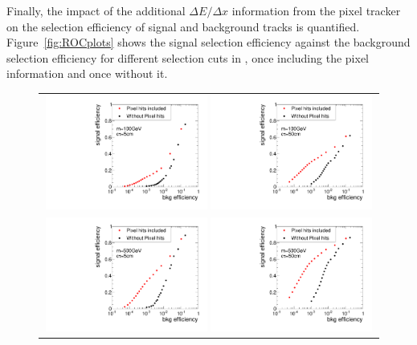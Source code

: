 Finally, the impact of the additional $\Delta E/\Delta x$ information from the pixel tracker on the selection efficiency of signal and background tracks is quantified.
Figure~\ref{fig:ROCplots} shows the signal selection efficiency against the background selection efficiency for different selection cuts in \ias, once including the pixel information and once without it.
\begin{figure}[!t]
  \centering 
  \vspace{50pt}
  \begin{tabular}{c}
    \includegraphics[width=0.49\textwidth]{figures/analysis/rocplot_wjets_mass_100GeV_ctau_5cm.pdf} 
    \includegraphics[width=0.49\textwidth]{figures/analysis/rocplot_wjets_mass_100GeV_ctau_50cm.pdf} \\
    \includegraphics[width=0.49\textwidth]{figures/analysis/rocplot_wjets_mass_500GeV_ctau_5cm.pdf} 
    \includegraphics[width=0.49\textwidth]{figures/analysis/rocplot_wjets_mass_500GeV_ctau_50cm.pdf}

\end{tabular}
\end{figure}

